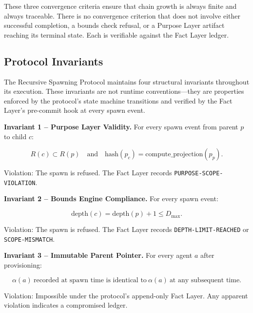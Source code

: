 These three convergence criteria ensure that chain growth is always finite and always traceable. There is no convergence criterion that does not involve either successful completion, a bounds check refusal, or a Purpose Layer artifact reaching its terminal state. Each is verifiable against the Fact Layer ledger.

\subsection{Protocol Invariants}

The Recursive Spawning Protocol maintains four structural invariants throughout its execution. These invariants are not runtime conventions---they are properties enforced by the protocol's state machine transitions and verified by the Fact Layer's pre-commit hook at every spawn event.

\bigskip
\noindent\textbf{Invariant 1 -- Purpose Layer Validity.} For every spawn event from parent $p$ to child $c$:

\begin{equation}
R(c) \subset R(p)\quad \text{and} \quad \mathrm{hash}(p_c) = \mathrm{compute\_projection}(p_p).
\label{eq:inv-purpose-validity}
\end{equation}

Violation: The spawn is refused. The Fact Layer records \texttt{PURPOSE-SCOPE-VIOLATION}.

\bigskip
\noindent\textbf{Invariant 2 -- Bounds Engine Compliance.} For every spawn event:

\begin{equation}
\mathrm{depth}(c) = \mathrm{depth}(p) + 1 \leq D_{\max}.
\label{eq:inv-bounds-compliance}
\end{equation}

Violation: The spawn is refused. The Fact Layer records \texttt{DEPTH-LIMIT-REACHED} or \texttt{SCOPE-MISMATCH}.

\bigskip
\noindent\textbf{Invariant 3 -- Immutable Parent Pointer.} For every agent $a$ after provisioning:

\begin{equation}
\alpha(a)\ \text{recorded at spawn time is identical to}\ \alpha(a)\ \text{at any subsequent time}.
\label{eq:inv-immutable-parent}
\end{equation}

Violation: Impossible under the protocol's append-only Fact Layer. Any apparent violation indicates a compromised ledger.


